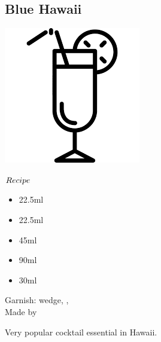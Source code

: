 \subsection{Blue Hawaii}
\vspace{-7.4mm}
\hspace{40mm}
\includegraphics[scale=.07]{cocktail_glass_tall.png}
\vspace{2.5mm}
\begin{itembox}[l]{\boldmath $Recipe$}
\begin{itemize}
\setlength{\parskip}{0cm}
\setlength{\itemsep}{0cm}
\item \vodka 22.5ml
\item \lrum 22.5ml
\item \bc 45ml
\item \pj 90ml
\item \ssm 30ml
\end{itemize}
\vspace{-4mm}
Garnish: \pineapple wedge, \cherry, \umbrella\\
Made by \shake
\end{itembox}
Very popular cocktail essential in Hawaii.

